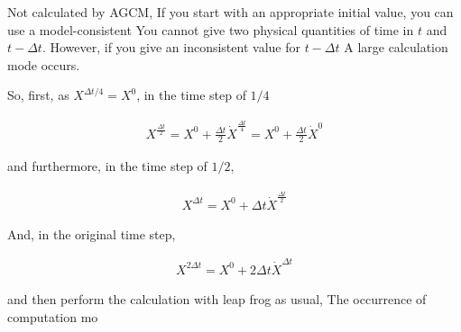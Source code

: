 Not calculated by AGCM, If you start with an appropriate initial value,
you can use a model-consistent You cannot give two physical quantities
of time in \(t\) and \(t-\Delta t\). However, if you give an
inconsistent value for \(t-\Delta t\) A large calculation mode occurs.

So, first, as \(X^{\Delta t/4} = X^0\), in the time step of \(1/4\)

\begin{eqnarray}
X^{\frac{\Delta t}{2}} = X^0 + \frac{\Delta t}{2}\dot{X}^{ \frac{\Delta t}{4}}  = X^0 + \frac{\Delta t}{2}\dot{X}^0
\end{eqnarray}

and furthermore, in the time step of \(1/2\),

\begin{eqnarray}
 X^{\Delta t} = X^0 + \Delta t \dot{X}^{\frac{\Delta t}{2}}
 \end{eqnarray}

And, in the original time step,

\begin{eqnarray}
 X^{2\Delta t} = X^0 + 2\Delta t \dot{X}^{\Delta t}
 \end{eqnarray}

and then perform the calculation with leap frog as usual, The occurrence
of computation mo
